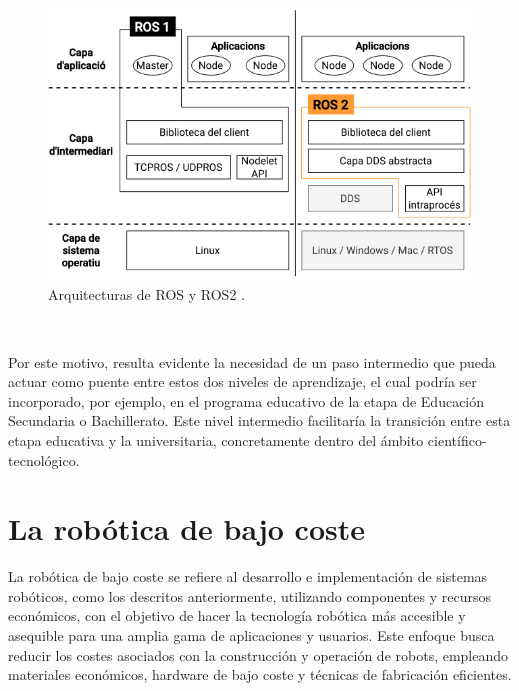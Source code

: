 \begin{figure} [h!]
  \begin{center}
    \includegraphics[width=12cm]{figs/ROS_and_ROS2}
  \end{center}
  \caption{Arquitecturas de ROS y ROS2 \citep{ros_ros2}.}
  \label{fig:ros}
\end{figure}\

Por este motivo, resulta evidente la necesidad de un paso intermedio que pueda
actuar como puente entre estos dos niveles de aprendizaje, el cual podría ser
incorporado, por ejemplo, en el programa educativo de la etapa de Educación
Secundaria o Bachillerato.
Este nivel intermedio facilitaría la transición entre esta etapa educativa y la
universitaria, concretamente dentro del ámbito científico-tecnológico.



\section{La robótica de bajo coste}
\label{sec:robotica_bajo_coste} %

La robótica de bajo coste se refiere al desarrollo e implementación de sistemas
robóticos, como los descritos anteriormente, utilizando componentes y recursos
económicos, con el objetivo de hacer la tecnología robótica más accesible y
asequible para una amplia gama de aplicaciones y usuarios.
Este enfoque busca reducir los costes asociados con la construcción y operación
de robots, empleando materiales económicos, hardware de bajo coste y técnicas
de fabricación eficientes.
\\

